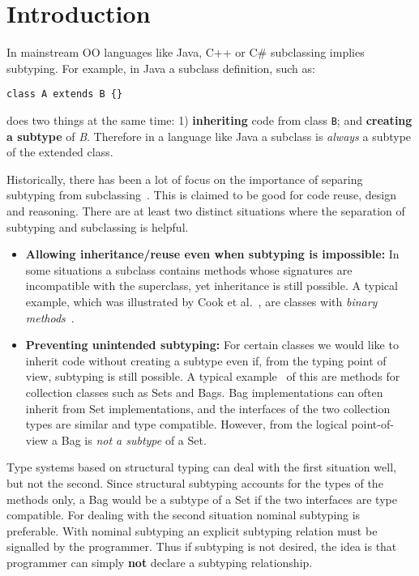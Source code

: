 \section{Introduction}\label{sec:intro}

In mainstream OO languages like Java, C++ or C\# subclassing 
implies subtyping. For example, in Java a subclass definition, such as:

\begin{lstlisting}
class A extends B {}
\end{lstlisting}

\noindent does two things at the same time:
1) {\bf inheriting} code from class \lstinline{B}; and {\bf creating 
a subtype} of \emph{B}. Therefore in a language like Java 
a subclass is \emph{always} a subtype of the extended class.

Historically, there has been a lot of focus on the importance of
separing subtyping from subclassing~\cite{cook}.  This is claimed to be
good for code reuse, design and reasoning. There are at
least two distinct situations where the separation of subtyping and 
subclassing is helpful.

\begin{itemize}

\item {\bf Allowing inheritance/reuse even when subtyping is impossible:} 
In some situations a subclass contains methods whose signatures 
are incompatible with the superclass, yet inheritance is still
possible. A typical example, which was illustrated by Cook et al.~\cite{cook}, are 
classes with \emph{binary methods}~\cite{bruce96binary}.

\item {\bf Preventing unintended subtyping:} For certain classes we
  would like to inherit code without creating a subtype even if, from
  the typing point of view, subtyping is still possible. A typical
  example~\cite{LaLonde:1991:SSS:110673.110679} of this are methods for collection classes such as Sets and
  Bags. Bag implementations can often inherit 
  from Set implementations, and the interfaces of the two collection types are
  similar and type compatible. 
  However, from the logical point-of-view a Bag is \emph{not a
    subtype} of a Set. 

\end{itemize}

Type systems based on structural typing can deal with the first
situation well, but not the second. Since structural subtyping
accounts for the types of the methods only, a Bag would be a subtype
of a Set if the two interfaces are type compatible. For dealing with
the second situation nominal subtyping is preferable. With nominal
subtyping an explicit subtyping relation must be signalled by the
programmer. Thus if subtyping is not desired, the idea is that 
programmer can simply {\bf not} declare a subtyping relationship.

